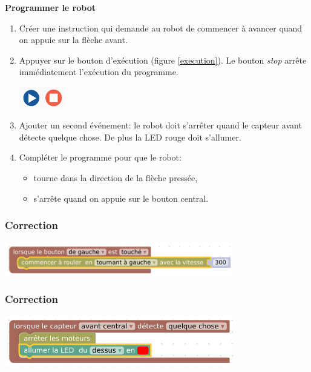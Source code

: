 \documentclass[svgnames,11pt]{beamer}
\begin{document}
\begin{frame}
    \frametitle{}

    \begin{activite}\textbf{Programmer le robot}
        \begin{enumerate}
            \item Créer une instruction qui demande au robot de commencer à avancer quand on appuie sur la flèche avant.
            \item Appuyer sur le bouton d'exécution (figure \ref{execution}). Le bouton \emph{stop} arrête immédiatement l'exécution du programme.
        \begin{center}
        \centering
        \includegraphics[width=2cm]{ressources/execution.png}
        \label{execution}
        \end{center}
            \item Ajouter un second événement: le robot doit s'arrêter quand le capteur avant détecte quelque chose. De plus la LED rouge doit s'allumer.
            \item Compléter le programme pour que le robot:
            \begin{itemize}
                \item tourne dans la direction de la flèche pressée,
                \item s'arrête quand on appuie sur le bouton central.
            \end{itemize}
        \end{enumerate}
        \end{activite}

\end{frame}
\begin{frame}
    \frametitle{Correction}

    \begin{center}
    \centering
    \includegraphics[width=10cm]{ressources/cor1.png}
    \end{center}

\end{frame}
\begin{frame}
    \frametitle{Correction}

    \begin{center}
    \centering
    \includegraphics[width=10cm]{ressources/cor2.png}
    \end{center}

\end{frame}
\end{document}
